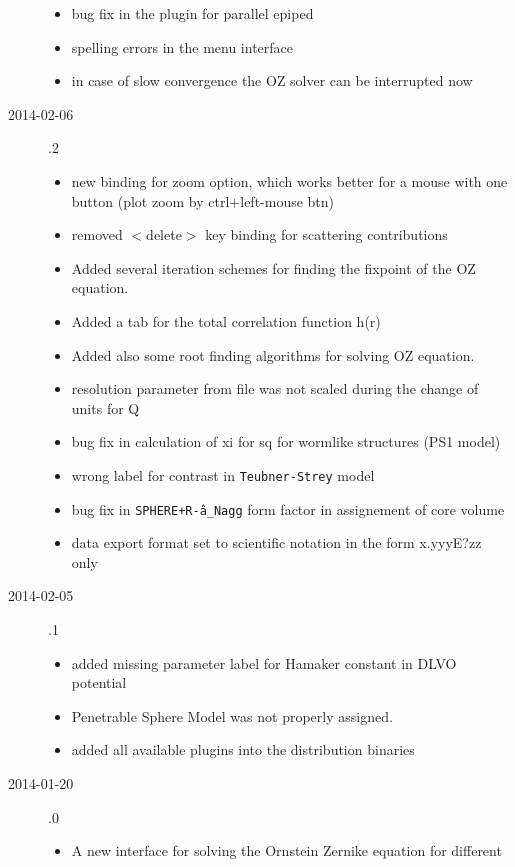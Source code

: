 \begin{description}
\begin{itemize}
        \item bug fix in the plugin for parallel epiped
        \item spelling errors in the menu interface
        \item in case of slow convergence the OZ solver can be interrupted now
    \end{itemize}
    \item[2014-02-06] .2
    \begin{itemize}
        \item new binding for zoom option, which works better for a mouse with one button
              (plot zoom by ctrl+left-mouse btn)
        \item removed $<$delete$>$ key binding for scattering contributions
        \item Added several iteration schemes for finding the fixpoint of the OZ equation.
        \item Added a tab for the total correlation function h(r)
        \item Added also some root finding algorithms for solving OZ equation.
        \item resolution parameter from file was not scaled during the change of units for Q
        \item bug fix in calculation of xi for sq for wormlike structures  (PS1 model)
        \item wrong label for contrast in \texttt{Teubner-Strey} model
        \item bug fix in \texttt{SPHERE+R\^-a\_Nagg} form factor in assignement of core volume
        \item data export format set to scientific notation in the form x.yyyE?zz only
    \end{itemize}
    \item[2014-02-05] .1
    \begin{itemize}
      \item added missing parameter label for Hamaker constant in DLVO potential
      \item Penetrable Sphere Model was not properly assigned.
      \item added all available plugins into the distribution binaries
    \end{itemize}
    \item[2014-01-20] .0
    \begin{itemize}
      \item A new interface for solving the Ornstein Zernike equation for different

\end{itemize}
\end{description}

